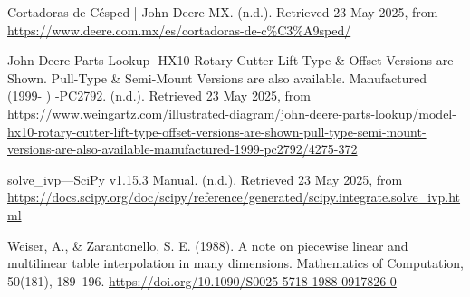 \documentclass[12pt]{article}
\begin{document}
Cortadoras de Césped | John Deere MX. (n.d.). Retrieved 23 May 2025, from \url{https://www.deere.com.mx/es/cortadoras-de-c%C3%A9sped/}

John Deere Parts Lookup -HX10 Rotary Cutter Lift-Type \& Offset Versions are Shown. Pull-Type \& Semi-Mount Versions are also available. Manufactured (1999- ) -PC2792. (n.d.). Retrieved 23 May 2025, from \url{https://www.weingartz.com/illustrated-diagram/john-deere-parts-lookup/model-hx10-rotary-cutter-lift-type-offset-versions-are-shown-pull-type-semi-mount-versions-are-also-available-manufactured-1999-pc2792/4275-372}

solve\_ivp—SciPy v1.15.3 Manual. (n.d.). Retrieved 23 May 2025, from \url{https://docs.scipy.org/doc/scipy/reference/generated/scipy.integrate.solve_ivp.html}

Weiser, A., \& Zarantonello, S. E. (1988). A note on piecewise linear and multilinear table interpolation in many dimensions. Mathematics of Computation, 50(181), 189–196. \url{https://doi.org/10.1090/S0025-5718-1988-0917826-0}
\end{document}

